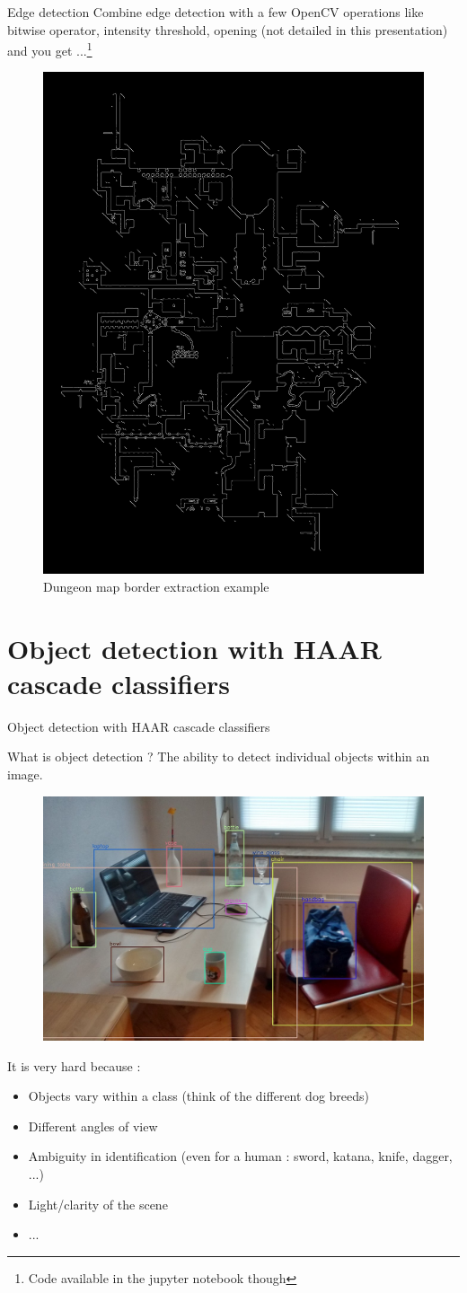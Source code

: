\documentclass[tikz,table,border=2mm]{beamer}
\begin{document}
\begin{frame}{Edge detection}
Combine edge detection with a few OpenCV operations like bitwise operator, intensity threshold, opening (not detailed in this presentation) and you get ...\footnote{Code available in the jupyter notebook though}
\begin{figure}
    \includegraphics[width=0.35\linewidth]{images/darragh_result.png}
    \caption{Dungeon map border extraction example}
\end{figure}
\end{frame}


\section{Object detection with HAAR cascade classifiers}
\begin{frame}{Object detection with HAAR cascade classifiers}
\begin{block}{What is object detection ?}
	The ability to detect individual objects within an image.
	\begin{figure}
    \includegraphics[width=0.35\linewidth]{images/obj_det_1.jpg}
\end{figure}
\end{block}
It is very hard because : 
\begin{itemize}
	\item Objects vary within a class (think of the different dog breeds)
	\item Different angles of view
	\item Ambiguity in identification (even for a human : sword, katana, knife, dagger, ...)
	\item Light/clarity of the scene
	\item ...
\end{itemize}
\end{frame}
\end{document}

